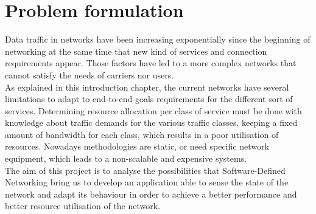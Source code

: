 \section{Problem formulation}
\label{sec:problemformulation}

Data traffic in networks have been increasing exponentially since the beginning of networking at the same time that new kind of services and connection requirements appear. Those factors have led to a more complex networks that cannot satisfy the needs of carriers nor users.\\  

As explained in this introduction chapter, the current networks have several limitations to adapt to end-to-end goals requirements for the different sort of services. Determining resource allocation per class of service must be done with knowledge about traffic demands for the various traffic classes, keeping a fixed amount of bandwidth for each class, which results in a poor utilisation of resources. Nowadays methodologies are static, or need specific network equipment, which leads to a non-scalable and expensive systems.\\

The aim of this project is to analyse the possibilities that Software-Defined Networking bring us to develop an application able to sense the state of the network and adapt its behaviour in order to achieve a better performance and better resource utilisation of the network.\\

